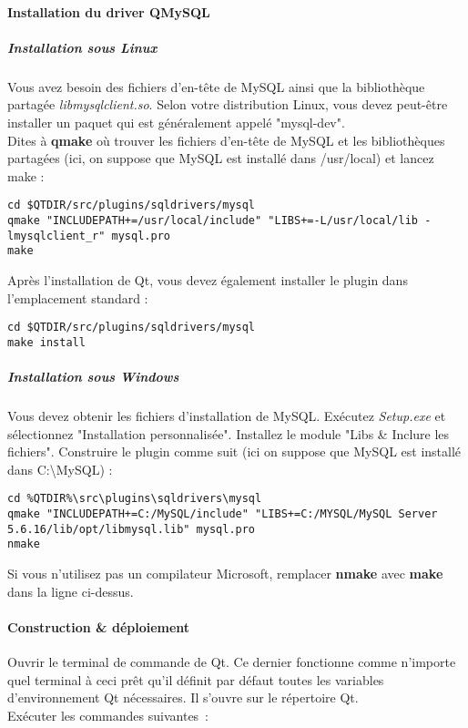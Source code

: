 \paragraph{Installation du driver QMySQL}

\subparagraph{Installation sous Linux }
 Vous avez besoin des fichiers d'en-tête de MySQL ainsi que la bibliothèque partagée \textit{libmysqlclient.so}. Selon votre distribution Linux, vous devez peut-être installer un paquet qui est généralement appelé "mysql-dev". 
\\ Dites à \textbf{qmake} où trouver les fichiers d'en-tête de MySQL et les bibliothèques partagées (ici, on suppose que MySQL est installé dans /usr/local) et lancez make : 
\begin{lstlisting}
cd $QTDIR/src/plugins/sqldrivers/mysql
qmake "INCLUDEPATH+=/usr/local/include" "LIBS+=-L/usr/local/lib -lmysqlclient_r" mysql.pro
make
\end{lstlisting}
Après l'installation de Qt, vous devez également installer le plugin dans l'emplacement standard :
\begin{lstlisting}
cd $QTDIR/src/plugins/sqldrivers/mysql
make install
\end{lstlisting}

\subparagraph{Installation sous Windows}
Vous devez obtenir les fichiers d'installation de MySQL. Exécutez \textit{Setup.exe} et sélectionnez "Installation personnalisée". Installez le module "Libs \& Inclure les fichiers". Construire le plugin comme suit (ici on suppose que MySQL est installé dans C:\textbackslash MySQL) : \\
\begin{lstlisting}
cd %QTDIR%\src\plugins\sqldrivers\mysql
qmake "INCLUDEPATH+=C:/MySQL/include" "LIBS+=C:/MYSQL/MySQL Server 5.6.16/lib/opt/libmysql.lib" mysql.pro
nmake
\end{lstlisting}

Si vous n'utilisez pas un compilateur Microsoft, remplacer \textbf{nmake} avec \textbf{make} dans la ligne ci-dessus.
\\


\paragraph{Construction \& déploiement}
Ouvrir le terminal de commande de Qt.
Ce dernier fonctionne comme n'importe quel terminal à ceci prêt qu'il définit par défaut toutes les variables d'environnement Qt nécessaires.
Il s'ouvre sur le répertoire Qt.
\\
Exécuter les commandes suivantes~:

